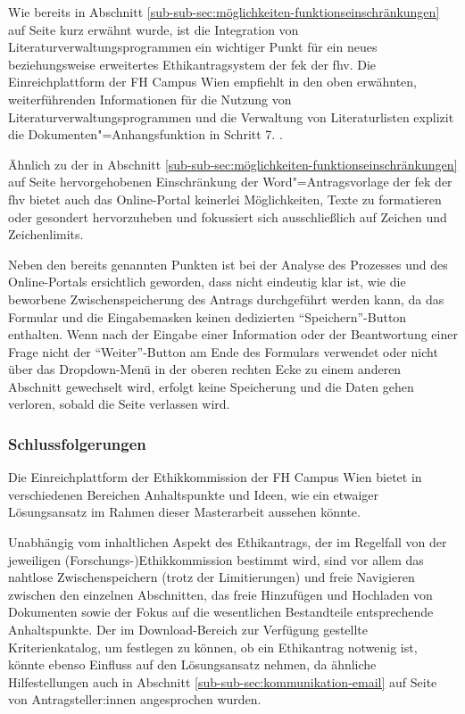 \documentclass[a4paper,12pt,twoside,numbers=noendperiod]{scrreprt}
\begin{document}
\medskip

Wie bereits in Abschnitt \ref{sub-sub-sec:möglichkeiten-funktionseinschränkungen} auf Seite \pageref{sub-sub-sec:möglichkeiten-funktionseinschränkungen} kurz erwähnt wurde, ist die Integration von Literaturverwaltungsprogrammen ein wichtiger Punkt für ein neues beziehungsweise erweitertes Ethikantragsystem der \acl{fek} der \acl{fhv}. Die Einreichplattform der FH Campus Wien empfiehlt in den oben erwähnten, weiterführenden Informationen für die Nutzung von Literaturverwaltungsprogrammen und die Verwaltung von Literaturlisten explizit die Dokumenten"=Anhangsfunktion in Schritt 7. \cite[5]{ethikkommission_fh_campus_wien_wissenswertes_2022}.

\medskip

Ähnlich zu der in Abschnitt \ref{sub-sub-sec:möglichkeiten-funktionseinschränkungen} auf Seite \pageref{sub-sub-sec:möglichkeiten-funktionseinschränkungen} hervorgehobenen Einschränkung der Word"=Antragsvorlage der \ac{fek} der \ac{fhv} bietet auch das Online-Portal keinerlei Möglichkeiten, Texte zu formatieren oder gesondert hervorzuheben und fokussiert sich ausschließlich auf Zeichen und Zeichenlimits.

\medskip

Neben den bereits genannten Punkten ist bei der Analyse des Prozesses und des Online-Portals ersichtlich geworden, dass nicht eindeutig klar ist, wie die beworbene Zwischenspeicherung des Antrags durchgeführt werden kann, da das Formular und die Eingabemasken keinen dedizierten \enquote{Speichern}-Button enthalten. Wenn nach der Eingabe einer Information oder der Beantwortung einer Frage nicht der \enquote{Weiter}-Button am Ende des Formulars verwendet oder nicht über das Dropdown-Menü in der oberen rechten Ecke zu einem anderen Abschnitt gewechselt wird, erfolgt keine Speicherung und die Daten gehen verloren, sobald die Seite verlassen wird.

\subsubsection*{Schlussfolgerungen}
\label{sub-sub-sec:schlussfolgerungen-fhcw}

Die Einreichplattform der Ethikkommission der FH Campus Wien bietet in verschiedenen Bereichen Anhaltspunkte und Ideen, wie ein etwaiger Lösungsansatz im Rahmen dieser Masterarbeit aussehen könnte.

Unabhängig vom inhaltlichen Aspekt des Ethikantrags, der im Regelfall von der jeweiligen (Forschungs-)Ethikkommission bestimmt wird, sind vor allem das nahtlose Zwischenspeichern (trotz der Limitierungen) und freie Navigieren zwischen den einzelnen Abschnitten, das freie Hinzufügen und Hochladen von Dokumenten sowie der Fokus auf die wesentlichen Bestandteile entsprechende Anhaltspunkte. Der im Download-Bereich zur Verfügung gestellte Kriterienkatalog, um festlegen zu können, ob ein Ethikantrag notwenig ist, könnte ebenso Einfluss auf den Lösungsansatz nehmen, da ähnliche Hilfestellungen auch in Abschnitt \ref{sub-sub-sec:kommunikation-email} auf Seite \pageref{sub-sub-sec:kommunikation-email} von Antragsteller:innen angesprochen wurden.
\end{document}
